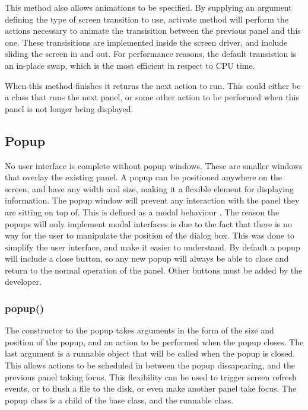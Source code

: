 This method also allows animations to be specified. By supplying an argument defining the type of screen transition to use, activate method will perform the actions necessary to animate the transisition between the previous panel and this one. These transisitions are implemented inside the screen driver, and include sliding the screen in and out. For performance reasons, the default transistion is an in-place swap, which is the most efficient in respect to CPU time.

When this method finishes it returns the next action to run. This could either be a class that runs the next panel, or some other action to be performed when this panel is not longer being displayed.

\subsection{Popup}

No user interface is complete without popup windows. These are smaller windows that overlay the existing panel. A popup can be positioned anywhere on the screen, and have any width and size, making it a flexible element for displaying information. The popup window will prevent any interaction with the panel they are sitting on top of. This is defined as a modal behaviour \cite{modal}. The reason the popups will only implement modal interfaces is due to the fact that there is no way for the user to manipulate the position of the dialog box. This was done to simplify the user interface, and make it easier to understand. By default a popup will include a close button, so any new popup will always be able to close and return to the normal operation of the panel. Other buttons must be added by the developer. 

\subsubsection{popup()}

The constructor to the popup takes arguments in the form of the size and position of the popup, and an action to be performed when the popup closes. The last argument is a runnable object that will be called when the popup is closed. This allows actions to be scheduled in between the popup dissapearing, and the previous panel taking focus. This flexibility can be used to trigger screen refresh events, or to flush a file to the disk, or even make another panel take focus. The popup class is a child of the base class, and the runnable class.

